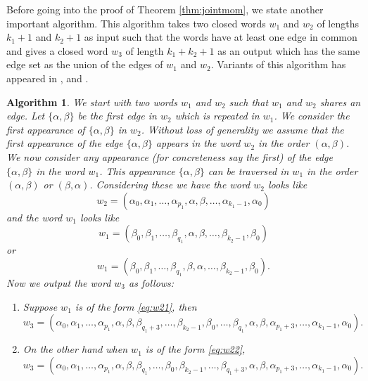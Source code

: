 \documentclass[12pt]{article}
\numberwithin{equation}{section}
\newtheorem{algorithm}{Algorithm}[section]
\numberwithin{equation}{section}
\theoremstyle{definition}
\renewcommand{\1}{\bf 1}
\begin{document}
\noindent 
Before going into the proof of Theorem \ref{thm:jointmom}, we state another important algorithm. This algorithm takes two closed words $w_{1}$ and $w_{2}$ of lengths $k_{1}+1$ and $k_{2}+1$ as input such that the words have at least one edge in common and gives a closed word $w_{3}$ of length $k_{1}+k_{2}+1$ as an output which has the same edge set as the union of the edges of $w_{1}$ and $w_{2}$. Variants of this algorithm has appeared in \citet{Ban16}, \citet{BanB16} and \citet{Banerjee2017}.    
\begin{algorithm}\label{alg:embed}
We start with two words $w_{1}$ and $w_{2}$ such that $w_{1}$ and $w_{2}$ shares an edge. Let $\{ \alpha, \beta \}$ be the first edge in $w_{2}$ which is repeated in $w_{1}$. We consider the first appearance of $\{\alpha, \beta \}$ in $w_{2}$. Without loss of generality we assume that the  first appearance of the edge $\{ \alpha , \beta \}$ appears in the word $w_{2}$ in the order $(\alpha,\beta)$. We now consider any appearance (for concreteness say the first) of the edge $\{ \alpha, \beta \}$ in the word $w_{1}$. This appearance $\{ \alpha ,\beta \}$ can be traversed in $w_{1}$ in the order $(\alpha,\beta)$ or $(\beta, \alpha)$.
Considering these we have the word $w_{2}$ looks like 
\begin{equation}\label{eq:w1before}
w_{2}= (\alpha_{0},\alpha_{1},\ldots,\alpha_{p_{1}}, \alpha, \beta,\ldots,\alpha_{k_{1}-1},\alpha_{0})
\end{equation} 
and the word $w_{1}$ looks like 
\begin{equation}\label{eq:w21}
w_{1}= \left( \beta_{0}, \beta_{1},\ldots,\beta_{q_{1}},\alpha, \beta, \ldots, \beta_{k_{2}-1},\beta_{0} \right)
\end{equation}
or
\begin{equation}\label{eq:w22} 
 w_{1}=(\beta_{0},\beta_{1},\ldots,\beta_{q_{1}},\beta,\alpha,\ldots,\beta_{k_{2}-1},\beta_{0}).
 \end{equation}
Now we output the word $w_{3}$ as follows:
\begin{enumerate}
\item Suppose $w_{1}$ is of the form \eqref{eq:w21}, then 
\begin{equation}\label{eq:w31}
w_{3}= \left(  \alpha_{0},\alpha_{1},\ldots,\alpha_{p_{1}},\alpha,\beta,\beta_{q_{1}+3},\ldots, \beta_{k_{2}-1}, \beta_{0},\ldots,\beta_{q_{1}},\alpha,\beta,\alpha_{p_{1}+3},\ldots,\alpha_{k_{1}-1},\alpha_{0} \right).
\end{equation}
\item On the other hand when $w_{1}$ is of the form \eqref{eq:w22}, 
\begin{equation}\label{eq:w32}
w_{3}= \left( \alpha_{0},\alpha_{1},\ldots,\alpha_{p_{1}},\alpha,\beta,\beta_{q_{1}},\ldots,\beta_{0},\beta_{k_{2}-1},\ldots,\beta_{q_{1}+3},\alpha,\beta,\alpha_{p_{1}+3},\ldots,\alpha_{k_{1}-1},\alpha_{0}\right). 
\end{equation}
\end{enumerate}
\end{algorithm}
\end{document}
